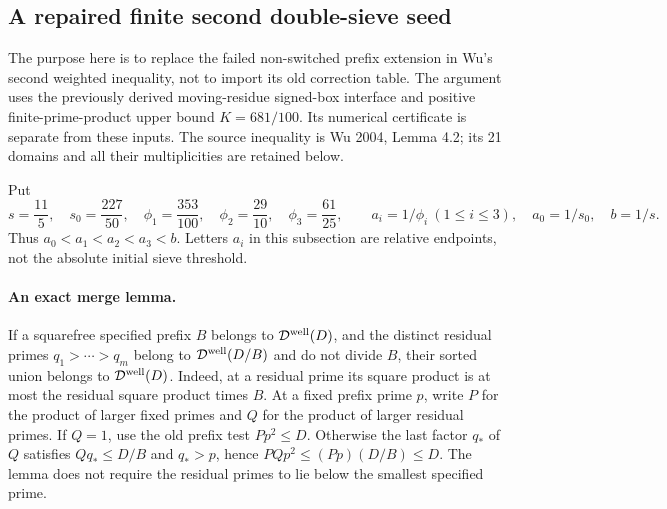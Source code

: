 \subsection{A repaired finite second double-sieve seed}
\label{sec:replacement-second-seed}

The purpose here is to replace the failed non-switched prefix extension
in Wu's second weighted inequality, not to import its old correction
table.  The argument uses the previously derived moving-residue
signed-box interface and positive finite-prime-product upper bound
$K=681/100$.  Its numerical certificate is separate from these inputs.
The source inequality is Wu 2004, Lemma 4.2; its 21 domains and all
their multiplicities are retained below.

Put
\[
 s=\frac{11}{5},\quad s_0=\frac{227}{50},\quad
 \phi_1=\frac{353}{100},\quad\phi_2=\frac{29}{10},\quad
 \phi_3=\frac{61}{25},\qquad
 a_i=1/\phi_i\ (1\le i\le3),\quad a_0=1/s_0,\quad b=1/s.
\]
Thus $a_0<a_1<a_2<a_3<b$.  Letters $a_i$ in this subsection are
relative endpoints, not the absolute initial sieve threshold.

\paragraph{An exact merge lemma.}
If a squarefree specified prefix $B$ belongs to
$\mathcal D^{\rm well}(D)$, and the distinct residual primes
$q_1>\cdots>q_m$ belong to $\mathcal D^{\rm well}(D/B)$ and do
not divide $B$, their sorted union belongs to
$\mathcal D^{\rm well}(D)$.
Indeed, at a residual prime its square product is at most the
residual square product times $B$.  At a fixed prefix prime $p$,
write $P$ for the product of larger fixed primes and $Q$ for the
product of larger residual primes.  If $Q=1$, use the old prefix
test $Pp^2\le D$.  Otherwise the last factor $q_*$ of $Q$ satisfies
$Qq_*\le D/B$ and $q_*>p$, hence
$PQp^2\le(Pp)(D/B)\le D$.
The lemma does not require the residual primes to lie below the
smallest specified prime.


